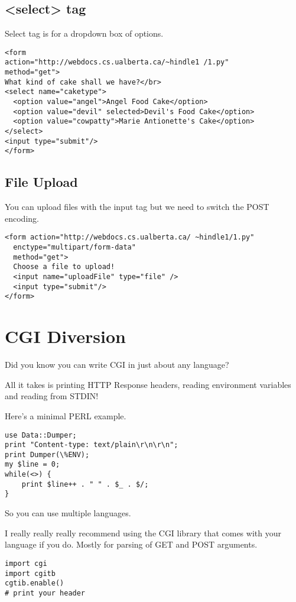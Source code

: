 \documentclass[../CMPUT-404-Notes.tex]{subfiles}
\begin{document}
\subsection{<select> tag}
Select tag is for a dropdown box of options.
\begin{verbatim}
<form 
action="http://webdocs.cs.ualberta.ca/~hindle1 /1.py" 
method="get">
What kind of cake shall we have?</br>
<select name="caketype">
  <option value="angel">Angel Food Cake</option>
  <option value="devil" selected>Devil's Food Cake</option>
  <option value="cowpatty">Marie Antionette's Cake</option>
</select>
<input type="submit"/>
</form>
\end{verbatim}

\subsection{File Upload}
You can upload files with the input tag but we need to switch the POST encoding.

\begin{verbatim}
<form action="http://webdocs.cs.ualberta.ca/ ~hindle1/1.py"
  enctype="multipart/form-data"
  method="get">
  Choose a file to upload!
  <input name="uploadFile" type="file" />
  <input type="submit"/>
</form>
\end{verbatim}

\section{CGI Diversion}
Did you know you can write CGI in just about any language?

All it takes is printing HTTP Response headers, reading environment variables and reading from STDIN!

Here's a minimal PERL example.

\begin{verbatim}
use Data::Dumper;
print "Content-type: text/plain\r\n\r\n";
print Dumper(\%ENV);
my $line = 0;
while(<>) {
    print $line++ . " " . $_ . $/;
}
\end{verbatim}

So you can use multiple languages.

I really really really recommend using the CGI library that comes with your language if you do. Mostly for parsing of GET and POST arguments.

\begin{verbatim}
import cgi
import cgitb
cgtib.enable()
# print your header
\end{verbatim}
\end{document}
